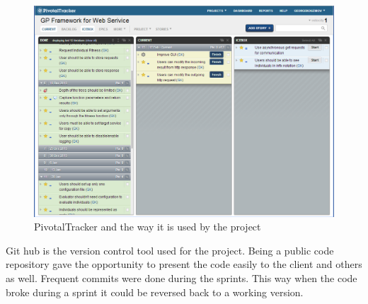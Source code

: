 \begin{figure}[htp]
\centering
\includegraphics[scale=0.5]{Figures/pivotalTracker.png}
\caption{PivotalTracker and the way it is used by the project}
\label{fig:pivotalTracker}
\end{figure}

Git hub is the version control tool used for the project. Being a public code repository gave the opportunity to present the code easily to the client and
others as well. Frequent commits were done during the sprints. This way when the code broke during a sprint it could be reversed back to a working version.

